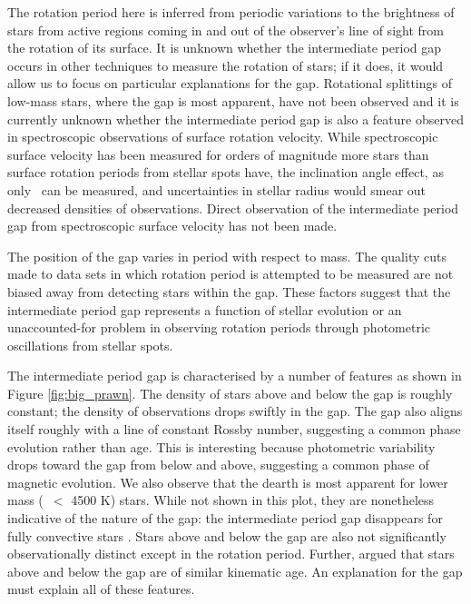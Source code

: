 The rotation period here is inferred from periodic variations to the brightness of stars from active regions coming in and out of the observer's line of sight from the rotation of its surface.
It is unknown whether the intermediate period gap occurs in other techniques to measure the rotation of stars; if it does, it would allow us to focus on particular explanations for the gap.
Rotational splittings of low-mass stars, where the gap is most apparent, have not been observed and it is currently unknown whether the intermediate period gap is also a feature observed in spectroscopic observations of surface rotation velocity.
While spectroscopic surface velocity has been measured for orders of magnitude more stars than surface rotation periods from stellar spots have, the inclination angle effect, as only \vsini\ can be measured, and uncertainties in stellar radius would smear out decreased densities of observations.
Direct observation of the intermediate period gap from spectroscopic surface velocity has not been made.

The position of the gap varies in period with respect to mass. 
The quality cuts made to data sets in which rotation period is attempted to be measured \citep[e.g. removing binaries and subgiants][]{mcquillan_rotation_2014, claytor_tess_2023} are not biased away from detecting stars within the gap.
These factors suggest that the intermediate period gap represents a function of stellar evolution or an unaccounted-for problem in observing rotation periods through photometric oscillations from stellar spots.

The intermediate period gap is characterised by a number of features as shown in Figure \ref{fig:big_prawn}.
The density of stars above and below the gap is roughly constant; the density of observations drops swiftly in the gap.
The gap also aligns itself roughly with a line of constant Rossby number, suggesting a common phase evolution rather than age.
This is interesting because photometric variability drops toward the gap from below and above, suggesting a common phase of magnetic evolution.
We also observe that the dearth is most apparent for lower mass (\teff\ $<$ 4500 K) stars.
While not shown in this plot, they are nonetheless indicative of the nature of the gap: the intermediate period gap disappears for fully convective stars \citep{lu_bridging_2022}.
Stars above and below the gap are also not significantly observationally distinct except in the rotation period.
Further, \citet{lu_bridging_2022} argued that stars above and below the gap are of similar kinematic age.
An explanation for the gap must explain all of these features.

